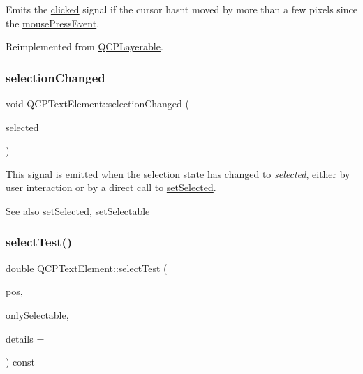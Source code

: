 Emits the \hyperlink{classQCPTextElement_ad2246a0e701c0655623f048737298334}{clicked} signal if the cursor hasn\textquotesingle{}t moved by more than a few pixels since the \hyperlink{classQCPTextElement_ad7b2c98355e3d2f912574b74fcee0574}{mouse\+Press\+Event}.

Reimplemented from \hyperlink{classQCPLayerable_aa0d79b005686f668622bbe66ac03ba2c}{Q\+C\+P\+Layerable}.

\mbox{\label{classQCPTextElement_a49f45b87ee9c1fe866c2cdd12af17a9a}} 
\subsubsection{\texorpdfstring{selection\+Changed}{selectionChanged}}
{\footnotesize\ttfamily void Q\+C\+P\+Text\+Element\+::selection\+Changed (\begin{DoxyParamCaption}\item[{bool}]{selected }\end{DoxyParamCaption})\hspace{0.3cm}{\ttfamily [signal]}}

This signal is emitted when the selection state has changed to {\itshape selected}, either by user interaction or by a direct call to \hyperlink{classQCPTextElement_aba5521f9fb22a5f3d2f09ab37d4a1751}{set\+Selected}.

\begin{DoxySeeAlso}{See also}
\hyperlink{classQCPTextElement_aba5521f9fb22a5f3d2f09ab37d4a1751}{set\+Selected}, \hyperlink{classQCPTextElement_a3c5f9b1897a036b16495ed3fb8371c55}{set\+Selectable} 
\end{DoxySeeAlso}
\mbox{\label{classQCPTextElement_a1e721bc2994a127ef5a8f0a514a5dbac}} 
\subsubsection{\texorpdfstring{select\+Test()}{selectTest()}}
{\footnotesize\ttfamily double Q\+C\+P\+Text\+Element\+::select\+Test (\begin{DoxyParamCaption}\item[{const Q\+PointF \&}]{pos,  }\item[{bool}]{only\+Selectable,  }\item[{Q\+Variant $\ast$}]{details = {} }\end{DoxyParamCaption}) const\hspace{0.3cm}{\ttfamily [virtual]}}


